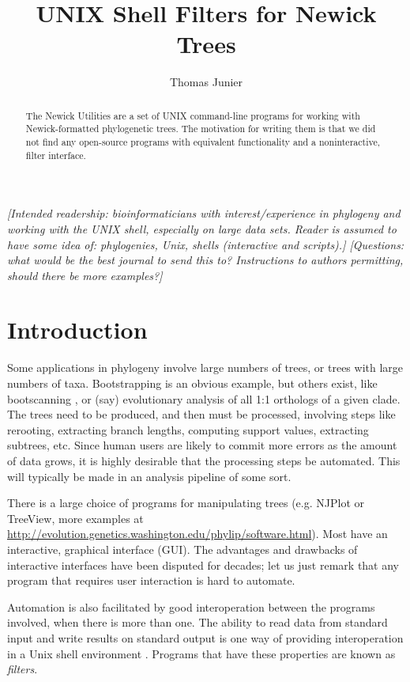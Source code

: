 \documentclass[a4paper,11pt]{article}
\title{UNIX Shell Filters for Newick Trees}
\author{Thomas Junier}
\newcommand{\gui}{\textsc{GUI}}
\newcommand{\unix}{Unix}
\begin{document}
\maketitle

\begin{abstract}
The Newick Utilities are a set of UNIX command-line programs for working with
Newick-formatted phylogenetic trees. The motivation for writing them is that we did not find any open-source programs with equivalent functionality and a noninteractive, filter interface.
\end{abstract}

\textit{\noindent{} [Intended readership: bioinformaticians with interest/experience in phylogeny and working with the UNIX shell, especially on large data sets. Reader is assumed to have some idea of: phylogenies, Unix, shells (interactive and scripts).]
[Questions: what would be the best journal to send this to? Instructions to authors permitting, should there be more examples?]}
 
\section*{Introduction}

Some applications in phylogeny involve large numbers of trees, or trees with large numbers of taxa. Bootstrapping is an obvious example, but others exist, like bootscanning \cite{Salminen1995}, or (say) evolutionary analysis of all 1:1 orthologs of a given clade. The trees need to be produced, and then must be processed, involving steps like rerooting, extracting branch lengths, computing support values, extracting subtrees, etc. Since human users are likely to commit more errors as the amount of  data grows, it is highly desirable that the processing steps be automated. This will typically be made in an analysis pipeline of some sort.

There is a large choice of programs for manipulating trees (e.g.
NJPlot \cite{Perrière1996} or TreeView, more examples at \url{
http://evolution.genetics.washington.edu/phylip/software.html}). Most have an interactive, graphical interface (\gui{}). The advantages and drawbacks of interactive interfaces have been disputed for decades; let us just remark that any program that requires user interaction is hard to automate.

Automation is also facilitated by good interoperation between the programs involved, when there is more than one. The ability to read data from standard input and write results on standard output is one way of providing interoperation in a \unix{} shell environment \cite{Gancarz2002}. Programs that have these properties are known as \textit{filters}.
\end{document}
